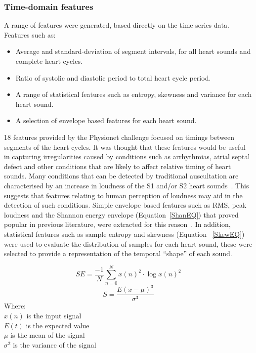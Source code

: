 \documentclass[titlepage, 12pt]{scrartcl} \usepackage{enumitem}
\begin{document}
\subsubsection{Time-domain features}\label{Time}
A range of features were generated, based directly on the time series data.
Features such as:
\begin{itemize}
    \item Average and standard-deviation of segment intervals, for all heart
        sounds and complete heart cycles.
    \item Ratio of systolic and diastolic period to total heart cycle period.
    \item A range of statistical features such as entropy, skewness and variance for
        each heart sound.
    \item A selection of envelope based features for each heart sound.
\end{itemize}

18 features provided by the Physionet challenge focused on timings between
segments of the heart cycles. It was thought that these features would be
useful in capturing irregularities caused by conditions such as arrhythmias,
atrial septal defect and other conditions that are likely to affect relative
timing of heart sounds.
Many conditions that can be detected by traditional auscultation are
characterised by an increase in loudness of the S1 and/or S2 heart
sounds~\parencite{Brown2008}. This suggests that features relating to human
perception of loudness may aid in the detection of such conditions.  Simple
envelope based features such as RMS, peak loudness and the Shannon energy
envelope (Equation~\ref{ShanEQ}) that proved popular in previous literature,
were extracted for this reason~\parencite[p.73-77]{Lerch2012}. In addition,
statistical features such as sample entropy and skewness (Equation
~\ref{SkewEQ}) were used to evaluate the distribution of samples for each heart
sound, these were selected to provide a representation of the temporal
``shape'' of each sound.

\begin{equation}\label{ShanEQ}
    SE = \frac{-1}{N}\sum\limits_{n=0}^N x(n)^2\cdot \log{x(n)^2}
\end{equation}
\begin{equation}\label{SkewEQ}
    S=\frac{E(x-\mu)^3}{\sigma^3}
\end{equation}
Where:\\
$x(n)$ is the input signal\\
$E(t)$ is the expected value\\
$\mu$ is the mean of the signal\\
$\sigma^2$ is the variance of the signal
\end{document}

